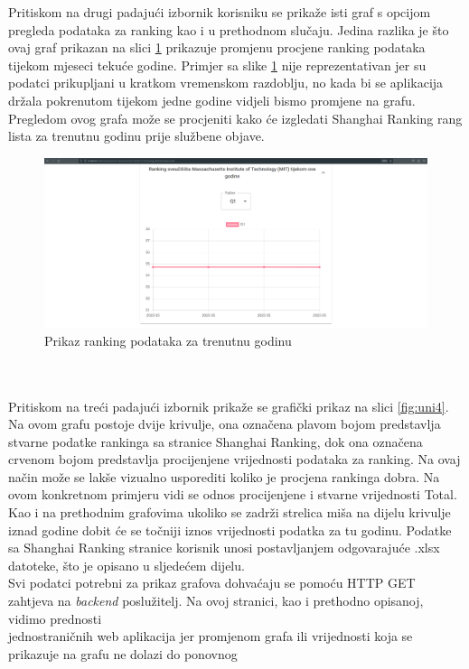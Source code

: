 \documentclass[times, utf8, zavrsni]{fer}
\begin{document}
\FloatBarrier 
Pritiskom na drugi padajući izbornik korisniku se prikaže isti graf s opcijom pregleda podataka za ranking
kao i u prethodnom slučaju. Jedina razlika je što ovaj graf prikazan na slici \ref{fig:uni3}
prikazuje promjenu procjene ranking podataka tijekom mjeseci tekuće godine. Primjer sa slike \ref{fig:uni3} nije reprezentativan jer su podatci 
prikupljani u kratkom vremenskom razdoblju, no kada bi se aplikacija držala pokrenutom tijekom jedne godine vidjeli bismo promjene na grafu. Pregledom ovog 
grafa može se procjeniti kako će izgledati Shanghai Ranking rang lista za trenutnu godinu prije službene objave. 
\begin{figure}[htb]
    \hspace*{-2cm}  
       \includegraphics[scale=0.21]{uni3.png} 
       \caption{Prikaz ranking podataka za trenutnu godinu}
       \label{fig:uni3}
       \end{figure} 
\\\\Pritiskom na treći padajući izbornik prikaže se grafički prikaz na slici \ref{fig:uni4}. Na ovom grafu postoje dvije krivulje, ona označena plavom bojom predstavlja 
stvarne podatke rankinga sa stranice Shanghai Ranking, dok ona označena crvenom bojom predstavlja procijenjene vrijednosti podataka za ranking.
Na ovaj način može se lakše vizualno usporediti koliko je procjena rankinga dobra. Na ovom konkretnom primjeru vidi se odnos procijenjene i stvarne 
vrijednosti Total. Kao i na prethodnim grafovima ukoliko se zadrži strelica miša na dijelu krivulje iznad godine dobit će se točniji iznos 
vrijednosti podatka za tu godinu.
Podatke sa Shanghai Ranking stranice korisnik unosi postavljanjem  
odgovarajuće .xlsx datoteke, što je opisano u sljedećem dijelu.
\\Svi podatci potrebni za prikaz grafova dohvaćaju se pomoću HTTP GET zahtjeva na \emph{backend} poslužitelj. Na ovoj stranici, kao i prethodno opisanoj, 
vidimo prednosti \\jednostraničnih web aplikacija jer promjenom grafa ili vrijednosti koja se prikazuje na grafu ne dolazi do ponovnog 
\end{document}

